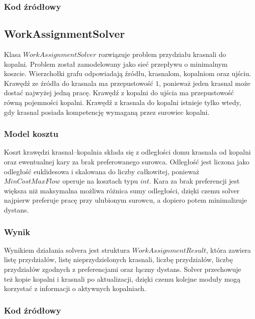 \documentclass{article}
\begin{document}
\subsubsection{Kod źródłowy}



\subsection{WorkAssignmentSolver}
Klasa $WorkAssignmentSolver$ rozwiązuje problem przydziału krasnali do kopalni. Problem został zamodelowany jako sieć przepływu o minimalnym koszcie. Wierzchołki grafu odpowiadają źródłu, krasnalom, kopalniom oraz ujściu. Krawędź ze źródła do krasnala ma przepustowość $1$, ponieważ jeden krasnal może dostać najwyżej jedną pracę. Krawędź z kopalni do ujścia ma przepustowość równą pojemności kopalni. Krawędź z krasnala do kopalni istnieje tylko wtedy, gdy krasnal posiada kompetencję wymaganą przez surowiec kopalni.

\subsubsection{Model kosztu}
Koszt krawędzi krasnal--kopalnia składa się z odległości domu krasnala od kopalni oraz ewentualnej kary za brak preferowanego surowca. Odległość jest liczona jako odległość euklidesowa i skalowana do liczby całkowitej, ponieważ $MinCostMaxFlow$ operuje na kosztach typu $int$. Kara za brak preferencji jest większa niż maksymalna możliwa różnica sumy odległości, dzięki czemu solver najpierw preferuje pracę przy ulubionym surowcu, a dopiero potem minimalizuje dystans.

\subsubsection{Wynik}
Wynikiem działania solvera jest struktura $WorkAssignmentResult$, która zawiera listę przydziałów, listę nieprzydzielonych krasnali, liczbę przydziałów, liczbę przydziałów zgodnych z preferencjami oraz łączny dystans. Solver przechowuje też kopie kopalni i krasnali po aktualizacji, dzięki czemu kolejne moduły mogą korzystać z informacji o aktywnych kopalniach.

\subsubsection{Kod źródłowy}


\end{document}
